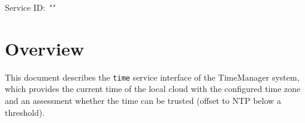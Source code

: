 \documentclass[a4paper]{arrowhead}
\begin{document}
\sloppy

\ArrowheadSetup

\begin{center}
  \vspace*{1cm}
  \huge{\arrowtitle}

  \vspace*{0.2cm}
  \LARGE{\arrowtype}
  \vspace*{1cm}

  \Large{Service ID: \textit{"\arrowid"}}

  \vspace*{\fill}


  \vspace*{1cm}
  \vspace*{\fill}

  \begin{abstract}
    This document describes the HTTP/1.1 protocol with TLS payload security and JSON payload encoding variant of the \texttt{time} service of the TimeManager system.
  \end{abstract}

  \vspace*{1cm}
\end{center}

\newpage

\tableofcontents
\newpage

\section{Overview}
\label{sec:overview}

This document describes the \texttt{time} service interface of the TimeManager system, which provides the current time of the local cloud with the configured time zone and an assessment whether the time can be trusted (offset to NTP below a threshold).
\end{document}
